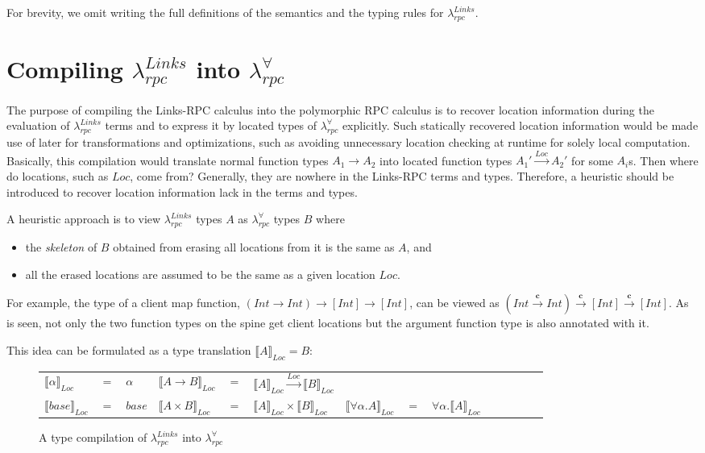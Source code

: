 \documentclass[a4paper]{article}
\theoremstyle{plain}
\theoremstyle{definition}
\newcommand{\polyrpc}{$\lambda_{rpc}^{\forall}$\xspace}
\newcommand{\linksrpc}{$\lambda_{rpc}^{Links}$\xspace}
\newcommand{\client}{\textbf{c}}
\newcommand{\funL}[1]{\xrightarrow{#1}}
\newcommand{\linkstycomp}[2]{\llbracket#1\rrbracket_{#2}}
\newcommand{\Loc}{Loc}
\begin{document}
For brevity, we omit writing the full definitions of the semantics and
the typing rules for \linksrpc.

\section{Compiling \linksrpc into \polyrpc}
\label{sec:translationtopolyrpc}

The purpose of compiling the Links-RPC calculus into the polymorphic
RPC calculus is to recover location information during the evaluation of
\linksrpc terms and to express it by located types of \polyrpc explicitly.
%
Such statically recovered location information would be made use of
later for transformations and optimizations, such as avoiding
unnecessary location checking at runtime for solely local computation.
%
Basically, this compilation would translate normal function types
$A_1 \rightarrow A_2$ into located function types $A_1' \funL{\Loc}
A_2'$ for some $A_i$s.
%
Then where do locations, such as $\Loc$, come from?
%
Generally, they are nowhere in the Links-RPC terms and types.
%
Therefore, a heuristic should be introduced to recover location
information lack in the terms and types.


A heuristic approach is to view \linksrpc types $A$ as \polyrpc types $B$ where
%
\begin{itemize}
  \item the {\it skeleton} of $B$ obtained from erasing all locations
    from it is the same as $A$, and
  \item all the erased locations are assumed to be the same as a given
    location $\Loc$.
\end{itemize}
%
For example, the type of a client map function, $(Int \rightarrow Int)
\rightarrow [Int] \rightarrow [Int]$, can be viewed as $(Int \funL{\client}
Int) \funL{\client} [Int] \funL{\client} [Int]$.
%
As is seen, not only the two function types on the spine get client
locations but the argument function type is also annotated with it.


%
This idea can be formulated as a type translation $\linkstycomp{A}{\Loc} = B$:

\begin{figure}[h]
\centering
\begin{tabular}{l l l l l l l l l l l l l l}
$\linkstycomp{\alpha}{\Loc}$ & $=$ & $\alpha$
&
$\linkstycomp{A \funL{} B}{\Loc}$ & $=$ & $\linkstycomp{A}{\Loc} \funL{Loc} \linkstycomp{B}{\Loc}$
\\
$\linkstycomp{base}{\Loc}$ & $=$ & $base$
&
$\linkstycomp{A\times B}{\Loc}$ & $=$ & $\linkstycomp{A}{\Loc}\times \linkstycomp{B}{\Loc}$
&
$\linkstycomp{\forall\alpha.A}{\Loc}$ & $=$ & $\forall\alpha.\linkstycomp{A}{\Loc}$
\\
\end{tabular}
\caption{A type compilation of \linksrpc into \polyrpc}
\label{fig:typecompilation}
\end{figure}
\end{document}
